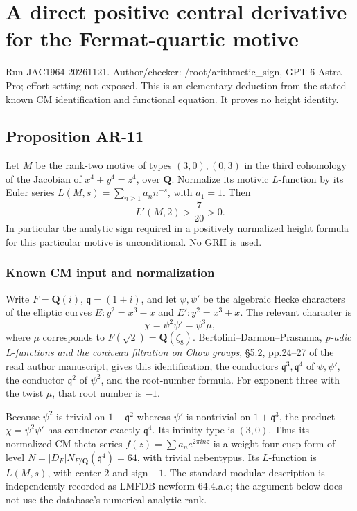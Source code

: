 \documentclass[11pt,a4paper]{article}
\begin{document}
\section{A direct positive central derivative for the Fermat-quartic
motive}\label{a-direct-positive-central-derivative-for-the-fermat-quartic-motive}

Run JAC1964-20261121. Author/checker: /root/arithmetic\_sign, GPT-6
Astra Pro; effort setting not exposed. This is an elementary deduction
from the stated known CM identification and functional equation. It
proves no height identity.

\subsection{Proposition AR-11}\label{proposition-ar-11}

Let \(M\) be the rank-two motive of types \((3,0),(0,3)\) in the third
cohomology of the Jacobian of \(x^4+y^4=z^4\), over \(\mathbf Q\).
Normalize its motivic \(L\)-function by its Euler series
\(L(M,s)=\sum_{n\ge1}a_n n^{-s}\), with \(a_1=1\). Then \[
L'(M,2)>\frac7{20}>0.
\tag{AR.14}
\] In particular the analytic sign required in a positively normalized
height formula for this particular motive is unconditional. No GRH is
used.

\subsubsection{Known CM input and
normalization}\label{known-cm-input-and-normalization}

Write \(F=\mathbf Q(i)\), \(\mathfrak q=(1+i)\), and let \(\psi,\psi'\)
be the algebraic Hecke characters of the elliptic curves \(E:y^2=x^3-x\)
and \(E':y^2=x^3+x\). The relevant character is \[
\chi=\psi^2\psi'=\psi^3\mu,
\] where \(\mu\) corresponds to \(F(\sqrt2)=\mathbf Q(\zeta_8)\).
Bertolini--Darmon--Prasanna, \emph{p-adic L-functions and the coniveau
filtration on Chow groups}, §5.2, pp.24--27 of the read author
manuscript, gives this identification, the conductors
\(\mathfrak q^3,\mathfrak q^4\) of \(\psi,\psi'\), the conductor
\(\mathfrak q^2\) of \(\psi^2\), and the root-number formula. For
exponent three with the twist \(\mu\), that root number is \(-1\).

Because \(\psi^2\) is trivial on \(1+\mathfrak q^2\) whereas \(\psi'\)
is nontrivial on \(1+\mathfrak q^3\), the product \(\chi=\psi^2\psi'\)
has conductor exactly \(\mathfrak q^4\). Its infinity type is \((3,0)\).
Thus its normalized CM theta series \(f(z)=\sum a_n e^{2\pi i nz}\) is a
weight-four cusp form of level
\(N=|D_F|N_{F/\mathbf Q}(\mathfrak q^4)=64\), with trivial nebentypus.
Its \(L\)-function is \(L(M,s)\), with center \(2\) and sign \(-1\). The
standard modular description is independently recorded as LMFDB newform
64.4.a.c; the argument below does not use the database's numerical
analytic rank.
\end{document}
